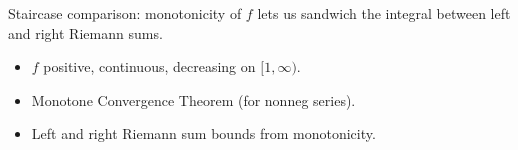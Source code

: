 \begin{remark*}
Staircase comparison: monotonicity of $f$ lets us sandwich the integral between left and right Riemann sums.
\end{remark*}

\begin{remark*}[Dependencies]
\begin{itemize}
  \item $f$ positive, continuous, decreasing on $[1,\infty)$.
  \item Monotone Convergence Theorem (for nonneg series).
  \item Left and right Riemann sum bounds from monotonicity.
\end{itemize}
\end{remark*}
